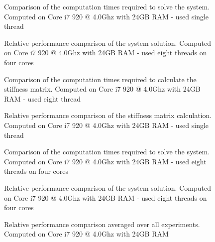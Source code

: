 \begin{figure}
\centerline{}
\caption{Comparison of the computation times required to solve the system. Computed on Core i7 920 @ 4.0Ghz with 24GB RAM - used single thread}
\label{fig:singleSystemi7CT}
\end{figure}

\begin{figure}
\centerline{}
\caption{Relative performance comparison of the system solution. Computed on Core i7 920 @ 4.0Ghz with 24GB RAM - used eight threads on four cores}
\label{fig:singleSystemi7}
\end{figure}

\begin{figure}
\centerline{}
\caption{Comparison of the computation times required to calculate the stiffness matrix. Computed on Core i7 920 @ 4.0Ghz with 24GB RAM - used eight thread}
\label{fig:multiStiffi7CT}
\end{figure}

\begin{figure}
\centerline{}
\caption{Relative performance comparison of the stiffness matrix calculation. Computed on Core i7 920 @ 4.0Ghz with 24GB RAM - used single thread}
\label{fig:multiStiffi7}
\end{figure}

\begin{figure}
\centerline{}
\caption{Comparison of the computation times required to solve the system. Computed on Core i7 920 @ 4.0Ghz with 24GB RAM - used eight threads on four cores}
\label{fig:multiSystemi7CT}
\end{figure}

\begin{figure}
\centerline{}
\caption{Relative performance comparison of the system solution. Computed on Core i7 920 @ 4.0Ghz with 24GB RAM - used eight threads on four cores}
\label{fig:multiSystemi7}
\end{figure}


\begin{figure}
\centerline{}
\caption{Relative performance comparison averaged over all experiments. Computed on Core i7 920 @ 4.0Ghz with 24GB RAM}
\label{fig:averagei7}
\end{figure}

